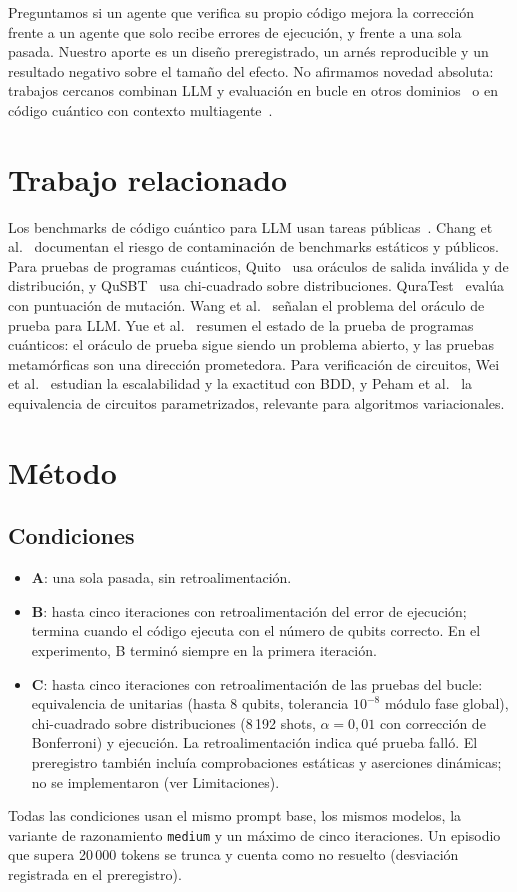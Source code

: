 \documentclass[conference]{IEEEtran}
\begin{document}
Preguntamos si un agente que verifica su propio código mejora la corrección frente a un agente que solo
recibe errores de ejecución, y frente a una sola pasada. Nuestro aporte es un diseño preregistrado, un arnés reproducible y un resultado
negativo sobre el tamaño del efecto. No afirmamos novedad absoluta: trabajos cercanos combinan LLM y
evaluación en bucle en otros dominios~\cite{funsearch} o en código cuántico con contexto multiagente~\cite{multiagente_qec}.

\section{Trabajo relacionado}
Los benchmarks de código cuántico para LLM usan tareas públicas~\cite{qiskit_humaneval, qhackbench}.
Chang et al.~\cite{chang_survey} documentan el riesgo de contaminación de benchmarks estáticos y públicos.
Para pruebas de programas cuánticos, Quito~\cite{quito} usa oráculos de salida inválida y de distribución,
y QuSBT~\cite{qusbt} usa chi-cuadrado sobre distribuciones. QuraTest~\cite{quratest} evalúa con puntuación de
mutación. Wang et al.~\cite{wang_tse} señalan el problema del oráculo de prueba para LLM. Yue et al.~\cite{ercim_yue} resumen el estado de la prueba de programas cuánticos: el oráculo de prueba sigue siendo un problema abierto, y las pruebas metamórficas son una dirección prometedora.
Para verificación de circuitos, Wei et al.~\cite{wei_dac} estudian la escalabilidad y la exactitud con BDD, y Peham et al.~\cite{peham_aspdac} la equivalencia de circuitos parametrizados, relevante para algoritmos variacionales.

\section{Método}
\subsection{Condiciones}
\begin{itemize}
\item \textbf{A}: una sola pasada, sin retroalimentación.
\item \textbf{B}: hasta cinco iteraciones con retroalimentación del error de ejecución; termina cuando el código ejecuta con el número de qubits correcto. En el experimento, B terminó siempre en la primera iteración.
\item \textbf{C}: hasta cinco iteraciones con retroalimentación de las pruebas del bucle: equivalencia de unitarias (hasta 8 qubits, tolerancia $10^{-8}$ módulo fase global), chi-cuadrado sobre distribuciones (8\,192 shots, $\alpha = 0{,}01$ con corrección de Bonferroni) y ejecución. La retroalimentación indica qué prueba falló. El preregistro también incluía comprobaciones estáticas y aserciones dinámicas; no se implementaron (ver Limitaciones).
\end{itemize}
Todas las condiciones usan el mismo prompt base, los mismos modelos, la variante de razonamiento \texttt{medium} y un máximo de cinco iteraciones.
Un episodio que supera 20\,000 tokens se trunca y cuenta como no resuelto (desviación registrada en el preregistro).
\end{document}
